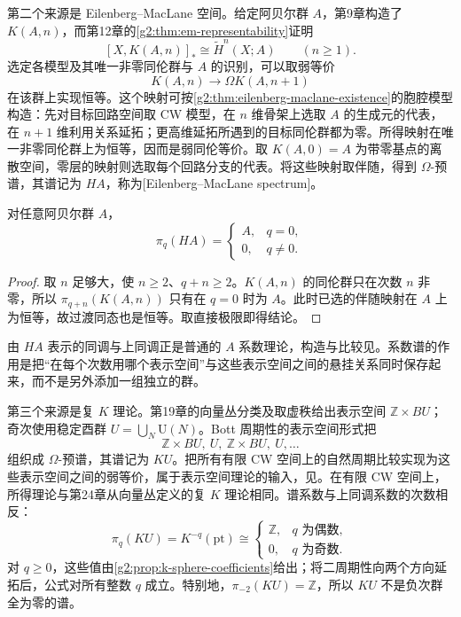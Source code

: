 \ProseParagraphBreak

第二个来源是 Eilenberg--MacLane 空间。给定阿贝尔群 \(A\)，第9章构造了 \(K(A,n)\)，而第12章的\cref{g2:thm:em-representability}证明
\[
	[X,K(A,n)]_*\cong\widetilde H^n(X;A)\qquad(n\ge1).
\]
选定各模型及其唯一非零同伦群与 \(A\) 的识别，可以取弱等价
\[
	K(A,n)\longrightarrow\Omega K(A,n+1)
\]
在该群上实现恒等。这个映射可按\cref{g2:thm:eilenberg-maclane-existence}的胞腔模型构造：先对目标回路空间取 CW 模型，在 \(n\) 维骨架上选取 \(A\) 的生成元的代表，在 \(n+1\) 维利用关系延拓；更高维延拓所遇到的目标同伦群都为零。所得映射在唯一非零同伦群上为恒等，因而是弱同伦等价。取 \(K(A,0)=A\) 为带零基点的离散空间，零层的映射则选取每个回路分支的代表。将这些映射取伴随，得到 \(\Omega\)-预谱，其谱记为 \(HA\)，称为[Eilenberg--MacLane spectrum]。

\begin{proposition}\label{g2:prop:em-spectrum-coefficients}
	对任意阿贝尔群 \(A\)，
	\[
		\pi_q(HA)=\begin{cases}A,&q=0,\\0,&q\ne0.\end{cases}
	\]
\end{proposition}
\begin{proof}
	取 \(n\) 足够大，使 \(n\ge2\)、\(q+n\ge2\)。\(K(A,n)\) 的同伦群只在次数 \(n\) 非零，所以 \(\pi_{q+n}(K(A,n))\) 只有在 \(q=0\) 时为 \(A\)。此时已选的伴随映射在 \(A\) 上为恒等，故过渡同态也是恒等。取直接极限即得结论。
\end{proof}

由 \(HA\) 表示的同调与上同调正是普通的 \(A\) 系数理论，构造与比较见\cite[第22章第1—2节]{May1999}。系数谱的作用是把“在每个次数用哪个表示空间”与这些表示空间之间的悬挂关系同时保存起来，而不是另外添加一组独立的群。

\ProseParagraphBreak

第三个来源是复 \(K\) 理论。第19章的向量丛分类及取虚秩给出表示空间 \(\mathbb Z\times BU\)；奇次使用稳定酉群 \(U=\bigcup_N\mathrm U(N)\)。Bott 周期性的表示空间形式把
\[
	\mathbb Z\times BU,\ U,\ \mathbb Z\times BU,\ U,\ldots
\]
组织成 \(\Omega\)-预谱，其谱记为 \(KU\)。把所有有限 CW 空间上的自然周期比较实现为这些表示空间之间的弱等价，属于表示空间理论的输入，见\cite[第24章第2节及第25章第7节]{May1999}。在有限 CW 空间上，所得理论与第24章从向量丛定义的复 \(K\) 理论相同。谱系数与上同调系数的次数相反：
\begin{equation}\label{g2:eq:ku-spectrum-coefficients}
	\pi_q(KU)=K^{-q}(\mathrm{pt})
	\cong\begin{cases}\mathbb Z,&q\text{ 为偶数},\\0,&q\text{ 为奇数}.
	\end{cases}
\end{equation}
对 \(q\ge0\)，这些值由\cref{g2:prop:k-sphere-coefficients}给出；将二周期性向两个方向延拓后，公式对所有整数 \(q\) 成立。特别地，\(\pi_{-2}(KU)=\mathbb Z\)，所以 \(KU\) 不是负次群全为零的谱。

